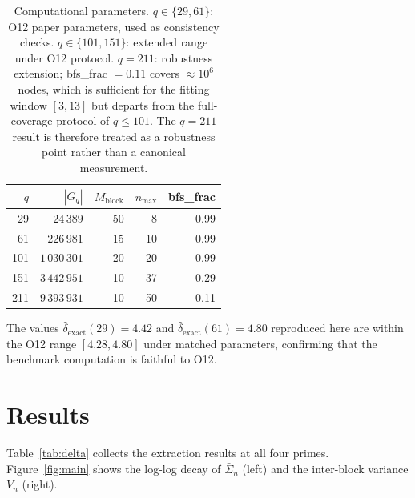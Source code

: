 \documentclass[11pt,a4paper]{article}
\theoremstyle{plain}
\theoremstyle{definition}
\newcommand{\dhat}{\hat\delta_{\mathrm{exact}}}
\newcommand{\Sigbar}{\bar\Sigma_n}
\begin{document}
  \begin{table}[ht]
    \centering
    \begin{tabular}{rrrrr}
      \toprule
      $q$ & $|G_q|$       & $M_{\mathrm{block}}$ & $n_{\max}$ & bfs\_frac \\
      \midrule
      29  & $24\,389$     & 50                   & 8          & 0.99      \\
      61  & $226\,981$    & 15                   & 10         & 0.99      \\
      101 & $1\,030\,301$ & 20                   & 20         & 0.99      \\
      151 & $3\,442\,951$ & 10                   & 37         & 0.29      \\
      211 & $9\,393\,931$ & 10                   & 50         & 0.11      \\
      \bottomrule
    \end{tabular}
    \caption{Computational parameters.
      $q \in \{29, 61\}$: O12 paper parameters, used as consistency checks.
      $q \in \{101, 151\}$: extended range under O12 protocol.
      $q = 211$: robustness extension; bfs\_frac $= 0.11$ covers $\approx 10^6$
      nodes, which is sufficient for the fitting window $[3, 13]$ but departs from
      the full-coverage protocol of $q \leq 101$.
      The $q = 211$ result is therefore treated as a robustness point rather than
      a canonical measurement.}
    \label{tab:params}
  \end{table}

  The values $\dhat(29) = 4.42$ and $\dhat(61) = 4.80$ reproduced here are
  within the O12 range $[4.28, 4.80]$ under matched parameters, confirming
  that the benchmark computation is faithful to O12.

  \section{Results}
  \label{sec:results}

  Table~\ref{tab:delta} collects the extraction results at all four primes.
  Figure~\ref{fig:main} shows the log-log decay of $\Sigbar$ (left) and
  the inter-block variance $V_n$ (right).
\end{document}
